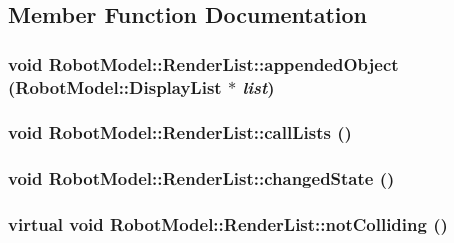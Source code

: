 \subsection{Member Function Documentation}
\hypertarget{class_robot_model_1_1_render_list_a635908222fa71402918e31eb2d725844}{
\subsubsection[{appendedObject}]{\setlength{\rightskip}{0pt plus 5cm}void RobotModel::RenderList::appendedObject ({\bf RobotModel::DisplayList} $\ast$ {\em list})}}
\label{class_robot_model_1_1_render_list_a635908222fa71402918e31eb2d725844}
\hypertarget{class_robot_model_1_1_render_list_a7cd62d6e6376bc02bd4244dcc174b465}{
\subsubsection[{callLists}]{\setlength{\rightskip}{0pt plus 5cm}void RobotModel::RenderList::callLists ()}}
\label{class_robot_model_1_1_render_list_a7cd62d6e6376bc02bd4244dcc174b465}
\hypertarget{class_robot_model_1_1_render_list_a9ad71d6ea6d0d1008e0705ced20f6aea}{
\subsubsection[{changedState}]{\setlength{\rightskip}{0pt plus 5cm}void RobotModel::RenderList::changedState ()}}
\label{class_robot_model_1_1_render_list_a9ad71d6ea6d0d1008e0705ced20f6aea}
\hypertarget{class_robot_model_1_1_render_list_a78436c997913ce9ad41a9bd1da9b3d96}{
\subsubsection[{notColliding}]{\setlength{\rightskip}{0pt plus 5cm}virtual void RobotModel::RenderList::notColliding ()}}
\label{class_robot_model_1_1_render_list_a78436c997913ce9ad41a9bd1da9b3d96}


